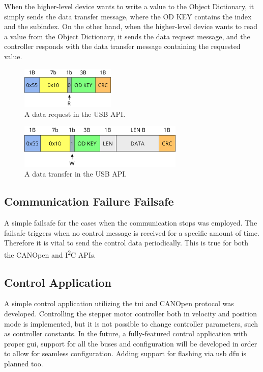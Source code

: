 When the higher-level device wants to write a value to the Object Dictionary, it simply sends the data transfer message, where the OD KEY contains the index and the subindex.
On the other hand, when the higher-level device wants to read a value from the Object Dictionary, it sends the data request message, and the controller responds with the data transfer message containing the requested value.

\begin{figure}[H]
    \centering
    \includegraphics[width=0.4\textwidth]{obrazky/usb_request}
    \caption{A data request in the USB API.}
    \label{fig:usb_request}
\end{figure}

\begin{figure}[H]
    \centering
    \includegraphics[width=0.7\textwidth]{obrazky/usb_transfer}
    \caption{A data transfer in the USB API.}
    \label{fig:usb_tansfer}
\end{figure}

\subsection{Communication Failure Failsafe}
A simple failsafe for the cases when the communication stops was employed.
The failsafe triggers when no control message is received for a specific amount of time.
Therefore it is vital to send the control data periodically.
This is true for both the CANOpen and I\textsuperscript{2}C APIs.


\subsection{Control Application}
A simple control application utilizing the \acs{tui} and CANOpen protocol was developed.
Controlling the stepper motor controller both in velocity and position mode is implemented, but it is not possible to change controller parameters, such as controller constants.
In the future, a fully-featured control application with proper \acs{gui}, support for all the buses and configuration will be developed in order to allow for seamless configuration.
Adding support for flashing via \acs{usb} \acs{dfu} is planned too.

